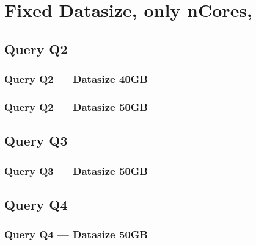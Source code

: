 \newpage
\section{Fixed Datasize, only nCores,}
\subsection{Query Q2}
\subsubsection{Query Q2 --- Datasize 40GB}



\newpage
\subsubsection{Query Q2 --- Datasize 50GB}



\newpage

\subsection{Query Q3}
\subsubsection{Query Q3 --- Datasize 50GB}



\newpage

\subsection{Query Q4}
\subsubsection{Query Q4 --- Datasize 50GB}



\newpage


